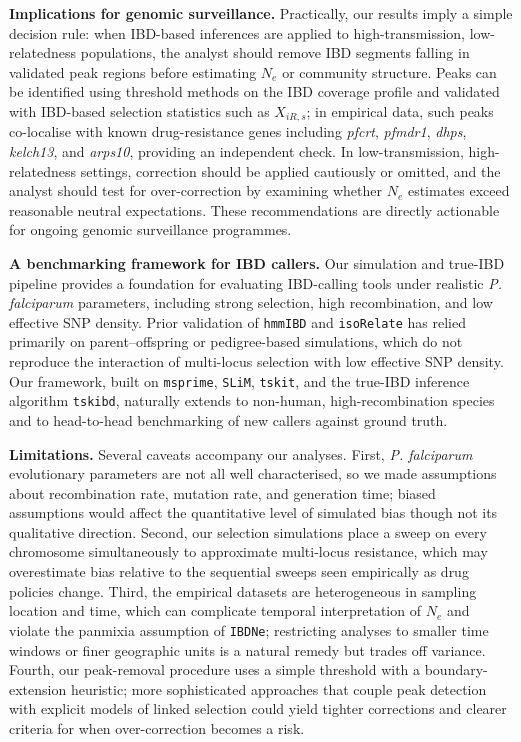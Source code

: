 \documentclass[11pt]{article}
\begin{document}
\textbf{Implications for genomic surveillance.} Practically, our results imply a simple decision rule: when IBD-based inferences are applied to high-transmission, low-relatedness populations, the analyst should remove IBD segments falling in validated peak regions before estimating $N_e$ or community structure. Peaks can be identified using threshold methods on the IBD coverage profile and validated with IBD-based selection statistics such as $X_{iR,s}$; in empirical data, such peaks co-localise with known drug-resistance genes including \textit{pfcrt}, \textit{pfmdr1}, \textit{dhps}, \textit{kelch13}, and \textit{arps10}, providing an independent check. In low-transmission, high-relatedness settings, correction should be applied cautiously or omitted, and the analyst should test for over-correction by examining whether $N_e$ estimates exceed reasonable neutral expectations. These recommendations are directly actionable for ongoing genomic surveillance programmes.

\textbf{A benchmarking framework for IBD callers.} Our simulation and true-IBD pipeline provides a foundation for evaluating IBD-calling tools under realistic \textit{P. falciparum} parameters, including strong selection, high recombination, and low effective SNP density. Prior validation of \texttt{hmmIBD} and \texttt{isoRelate} has relied primarily on parent--offspring or pedigree-based simulations, which do not reproduce the interaction of multi-locus selection with low effective SNP density. Our framework, built on \texttt{msprime}, \texttt{SLiM}, \texttt{tskit}, and the true-IBD inference algorithm \texttt{tskibd}, naturally extends to non-human, high-recombination species and to head-to-head benchmarking of new callers against ground truth.

\textbf{Limitations.} Several caveats accompany our analyses. First, \textit{P. falciparum} evolutionary parameters are not all well characterised, so we made assumptions about recombination rate, mutation rate, and generation time; biased assumptions would affect the quantitative level of simulated bias though not its qualitative direction. Second, our selection simulations place a sweep on every chromosome simultaneously to approximate multi-locus resistance, which may overestimate bias relative to the sequential sweeps seen empirically as drug policies change. Third, the empirical datasets are heterogeneous in sampling location and time, which can complicate temporal interpretation of $N_e$ and violate the panmixia assumption of \texttt{IBDNe}; restricting analyses to smaller time windows or finer geographic units is a natural remedy but trades off variance. Fourth, our peak-removal procedure uses a simple threshold with a boundary-extension heuristic; more sophisticated approaches that couple peak detection with explicit models of linked selection could yield tighter corrections and clearer criteria for when over-correction becomes a risk.
\end{document}
